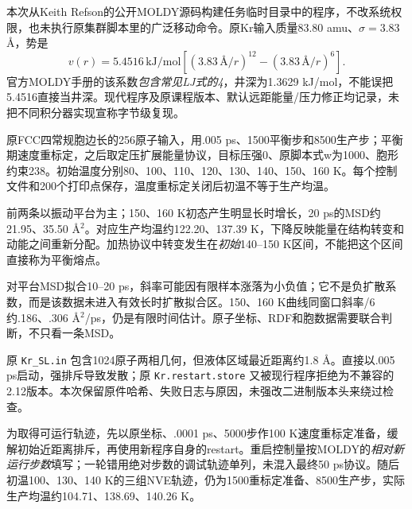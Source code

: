 本次从Keith Refson的公开MOLDY源码构建任务临时目录中的程序，不改系统权限，也未执行原集群脚本里的广泛移动命令。原Kr输入质量83.80 amu、$\sigma=3.83$ \AA{}，势是
\[
 v(r)=5.4516\,\mathrm{kJ/mol}\left[(3.83\,\text{\AA}/r)^{12}-(3.83\,\text{\AA}/r)^6\right].
\]
官方MOLDY手册的该系数\emph{包含常见LJ式的4}，井深为1.3629 kJ/mol，不能误把5.4516直接当井深。现代程序及原课程版本、默认远距能量/压力修正均记录，未把不同积分器实现宣称字节级复现。

原FCC四常规胞边长的256原子输入，用.005 ps、1500平衡步和8500生产步；平衡期速度重标定，之后取定压扩展能量协议，目标压强0、原脚本式w为1000、胞形约束238。初始温度分别80、100、110、120、130、140、150、160 K。每个控制文件和200个打印点保存，温度重标定关闭后初温不等于生产均温。
\begin{center}\end{center}
前两条以振动平台为主；150、160 K初态产生明显长时增长，20 ps的MSD约21.95、35.50 \AA$^2$。对应生产均温约122.20、137.39 K，下降反映能量在结构转变和动能之间重新分配。加热协议中转变发生在\emph{初始}140--150 K区间，不能把这个区间直接称为平衡熔点。

对平台MSD拟合10--20 ps，斜率可能因有限样本涨落为小负值；它不是负扩散系数，而是该数据未进入有效长时扩散拟合区。150、160 K曲线同窗口斜率/6约.186、.306 \AA$^2$/ps，仍是有限时间估计。原子坐标、RDF和胞数据需要联合判断，不只看一条MSD。

原 \texttt{Kr\_SL.in} 包含1024原子两相几何，但液体区域最近距离约1.8 \AA{}。直接以.005 ps启动，强排斥导致发散；原 \texttt{Kr.restart.store} 又被现行程序拒绝为不兼容的2.12版本。本次保留原件哈希、失败日志与原因，未强改二进制版本头来绕过检查。

为取得可运行轨迹，先以原坐标、.0001 ps、5000步作100 K速度重标定准备，缓解初始近距离排斥，再使用新程序自身的restart。重启控制量按MOLDY的\emph{相对新运行步数}填写；一轮错用绝对步数的调试轨迹单列，未混入最终50 ps协议。随后初温100、130、140 K的三组NVE轨迹，仍为1500重标定准备、8500生产步，实际生产均温约104.71、138.69、140.26 K。

